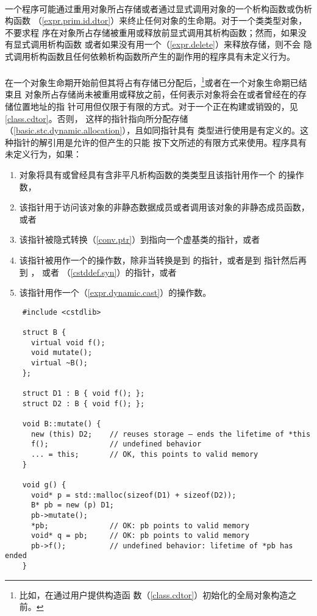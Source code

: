 \paragraph{} %
一个程序可能通过重用对象所占存储或者通过显式调用对象的一个析构函数或伪析构函数
（\ref{expr.prim.id.dtor}）来终止任何对象的生命期。对于一个类类型对象，不要求程
序在对象所占存储被重用或释放前显式调用其析构函数；然而，如果没有显式调用析构函数
或者如果没有用一个（\ref{expr.delete}）来释放存储，则不会
隐式调用析构函数且任何依赖析构函数所产生的副作用的程序具有未定义行为。

\paragraph{} %
在一个对象生命期开始前但其将占有存储已分配后，\footnote{比如，在通过用户提供构造函
数（\ref{class.cdtor}）初始化的全局对象构造之前。}或者在一个对象生命期已结束且
对象所占存储尚未被重用或释放之前，任何表示对象将会在或者曾经在的存储位置地址的指
针可用但仅限于有限的方式。对于一个正在构建或销毁的，见\ref{class.cdtor}。否则，
这样的指针指向所分配存储（\ref{basic.stc.dynamic.allocation}），且如同指针具有
类型进行使用是有定义的。这种指针的解引用是允许的但产生的\lvalue{}只能
按下文所述的有限方式来使用。程序具有未定义行为，如果：
\begin{enumerate}
  \item 对象将具有或曾经具有含非平凡析构函数的类类型且该指针用作一个
        的操作数，
  \item 该指针用于访问该对象的非静态数据成员或者调用该对象的非静态成员函数，或者
  \item 该指针被隐式转换（\ref{conv.ptr}）到指向一个虚基类的指针，或者
  \item 该指针被用作一个的操作数，除非当转换是到
        的指针，或者是到 指针然后再到
        ， 或者 
        （\ref{cstddef.syn}）的指针，或者
  \item 该指针用作一个（\ref{expr.dynamic.cast}）的操作数。
\end{enumerate}

\begin{example}
  \begin{lstlisting}
    #include <cstdlib>

    struct B {
      virtual void f();
      void mutate();
      virtual ~B();
    };

    struct D1 : B { void f(); };
    struct D2 : B { void f(); };

    void B::mutate() {
      new (this) D2;    // reuses storage — ends the lifetime of *this
      f();              // undefined behavior
      ... = this;       // OK, this points to valid memory
    }

    void g() {
      void* p = std::malloc(sizeof(D1) + sizeof(D2));
      B* pb = new (p) D1;
      pb->mutate();
      *pb;              // OK: pb points to valid memory
      void* q = pb;     // OK: pb points to valid memory
      pb->f();          // undefined behavior: lifetime of *pb has ended
    }
  \end{lstlisting}
\end{example}


